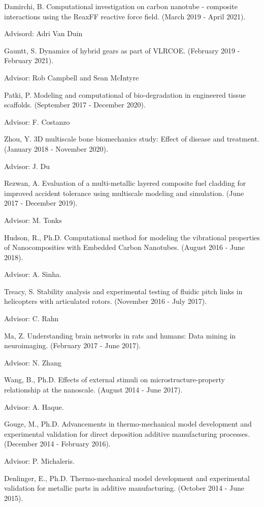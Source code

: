 \documentclass[a4paper,10pt]{article}
\begin{document}
Damirchi, B. Computational investigation on carbon nanotube - composite interactions using the ReaxFF reactive force field. (March 2019 - April 2021).

Advisord: Adri Van Duin

Gauntt, S. Dynamics of hybrid gears as part of VLRCOE. (February 2019 - February 2021).

Advisor: Rob Campbell and Sean McIntyre

Patki, P. Modeling and computational of bio-degradation in engineered tissue scaffolds. (September 2017 - December 2020).

Advisor: F. Costanzo

Zhou, Y. 3D multiscale bone biomechanics study: Effect of disease and treatment. (January 2018 - November 2020).

Advisor: J. Du

Rezwan, A. Evaluation of a multi-metallic layered composite fuel cladding for improved accident tolerance using multiscale modeling and simulation. (June 2017 - December 2019).

Advisor: M. Tonks

Hudson, R., Ph.D. Computational method for modeling the vibrational properties of Nanocomposities with Embedded Carbon Nanotubes. (August 2016 - June 2018).

Advisor: A. Sinha.

Treacy, S. Stability analysis and experimental testing of fluidic pitch links in helicopters with articulated rotors. (November 2016 - July 2017).

Advisor: C. Rahn

Ma, Z. Understanding brain networks in rats and humans: Data mining in neuroimaging. (February 2017 - June 2017).

Advisor: N. Zhang

Wang, B., Ph.D. Effects of external stimuli on microstructure-property relationship at the nanoscale. (August 2014 - June 2017).

Advisor: A. Haque.

Gouge, M., Ph.D. Advancements in thermo-mechanical model development and experimental validation for direct deposition additive manufacturing processes. (December 2014 - February 2016).

Advisor: P. Michaleris.

Denlinger, E., Ph.D. Thermo-mechanical model development and experimental validation for metallic parts in additive manufacturing. (October 2014 - June 2015).
\end{document}
